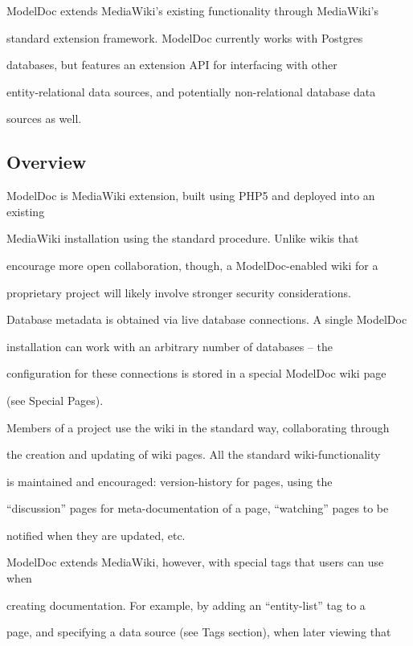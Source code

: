 \documentclass{acm_proc_article-sp}
\begin{document}
ModelDoc extends MediaWiki's existing functionality through MediaWiki's

standard extension framework.  ModelDoc currently works with Postgres

databases, but features an extension API for interfacing with other

entity-relational data sources, and potentially non-relational database data

sources as well.



\subsection{Overview}



ModelDoc is MediaWiki extension, built using PHP5 and deployed into an existing

MediaWiki installation using the standard procedure.  Unlike wikis that

encourage more open collaboration, though, a ModelDoc-enabled wiki for a

proprietary project will likely involve stronger security considerations.



Database metadata is obtained via live database connections.  A single ModelDoc

installation can work with an arbitrary number of databases -- the

configuration for these connections is stored in a special ModelDoc wiki page

(see Special Pages).



Members of a project use the wiki in the standard way, collaborating through

the creation and updating of wiki pages.  All the standard wiki-functionality

is maintained and encouraged: version-history for pages, using the

``discussion'' pages for meta-documentation of a page, ``watching'' pages to be

notified when they are updated, etc.



ModelDoc extends MediaWiki, however, with special tags that users can use when

creating documentation.  For example, by adding an ``entity-list'' tag to a

page, and specifying a data source (see Tags section), when later viewing that
\end{document}
